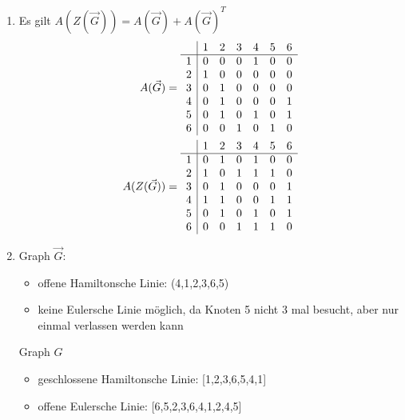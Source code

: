 \documentclass{article}
\begin{document}
\begin{enumerate}[label=(\alph*)]
\begin{center}
		\end{center}
		\item Es gilt $A(Z(\vec{G})) = A(\vec{G}) + A(\vec{G})^T$
		\begin{align}
			A(\vec{G}) &= \begin{array}{c|cccccc}
				& 1 & 2 & 3 & 4 & 5 & 6 \\
				\hline
				1 & 0 & 0 & 0 & 1 & 0 & 0 \\
				2 & 1 & 0 & 0 & 0 & 0 & 0 \\
				3 & 0 & 1 & 0 & 0 & 0 & 0 \\
				4 & 0 & 1 & 0 & 0 & 0 & 1 \\
				5 & 0 & 1 & 0 & 1 & 0 & 1 \\
				6 & 0 & 0 & 1 & 0 & 1 & 0
			\end{array} \notag \\
			A(Z(\vec{G})) &= \begin{array}{c|cccccc}
				& 1 & 2 & 3 & 4 & 5 & 6 \\
				\hline
				1 & 0 & 1 & 0 & 1 & 0 & 0 \\
				2 & 1 & 0 & 1 & 1 & 1 & 0 \\
				3 & 0 & 1 & 0 & 0 & 0 & 1 \\
				4 & 1 & 1 & 0 & 0 & 1 & 1 \\
				5 & 0 & 1 & 0 & 1 & 0 & 1 \\
				6 & 0 & 0 & 1 & 1 & 1 & 0
			\end{array} \notag
		\end{align}
		\item Graph $\vec{G}$:
		\begin{itemize}
			\item offene Hamiltonsche Linie: (4,1,2,3,6,5)
			\item keine Eulersche Linie möglich, da Knoten 5 nicht 3 mal besucht, aber nur einmal verlassen werden kann
		\end{itemize}
		Graph $G$
		\begin{itemize}
			\item geschlossene Hamiltonsche Linie: [1,2,3,6,5,4,1]
			\item offene Eulersche Linie: [6,5,2,3,6,4,1,2,4,5]
		\end{itemize}
	\end{enumerate}
	
\end{document}
